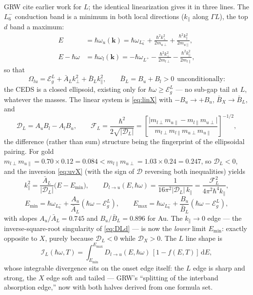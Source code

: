 \documentclass[11pt,a4paper]{article}
\numberwithin{equation}{section}
\newcommand{\hw}{\hbar\omega}
\newcommand{\EgL}{\mathcal{E}_g^{L}}
\newcommand{\cD}{\mathcal{D}}
\newcommand{\cF}{\mathcal{F}}
\newcommand{\cI}{\mathcal{I}}
\newcommand{\BX}{\bar{B}_X}
\newcommand{\AL}{\bar{A}_L}
\newcommand{\BL}{\bar{B}_L}
\newcommand{\kperp}{k_{\perp}}
\newcommand{\kpar}{k_{\parallel}}
\newcommand{\dd}{\mathrm{d}}
\newcommand{\wLsix}{\hbar\omega_{L_6^-}}
\newcommand{\wLplus}{\hbar\omega_{L^+}}
\begin{document}
GRW cite earlier work for $L$; the identical linearization gives it
in three lines.  The $L_6^-$ conduction band is a minimum in both
local directions ($\kpar$ along $\Gamma L$), the top $d$ band a
maximum:
\begin{align}
E&=\hbar\omega_u(\mathbf k)
=\wLsix+\frac{\hbar^2\kperp^2}{2m_{u\perp}}
       +\frac{\hbar^2\kpar^2}{2m_{u\parallel}},
\label{eq:Lbands1}\\[2pt]
E-\hw&=\hbar\omega_l(\mathbf k)
=-\wLplus-\frac{\hbar^2\kperp^2}{2m_{l\perp}}
         -\frac{\hbar^2\kpar^2}{2m_{l\parallel}} ,
\label{eq:Lbands2}
\end{align}
so that
\begin{equation}
\Omega_{lu}=\EgL+\AL\kperp^2+\BL\kpar^2,
\qquad \BL=B_u+B_l>0\ \ \text{unconditionally:}
\end{equation}
the CEDS is a closed ellipsoid, existing only for $\hw\ge\EgL$
--- no sub-gap tail at $L$, whatever the masses.  The linear system
is \eqref{eq:linX} with $-B_u\to+B_u$, $\BX\to\BL$, and
\begin{equation}
\cD_L=A_uB_l-A_lB_u,
\qquad
\cF_L=\frac{\hbar^2}{2\sqrt{|\cD_L|}}
=\left[\frac{\bigl|m_{l\perp}m_{u\parallel}
             -m_{l\parallel}m_{u\perp}\bigr|}
{m_{l\perp}m_{l\parallel}m_{u\perp}m_{u\parallel}}\right]^{-1/2},
\label{eq:DL}
\end{equation}
the difference (rather than sum) structure being the fingerprint of
the ellipsoidal pairing.  For gold
$m_{l\perp}m_{u\parallel}=0.70\times0.12=0.084
<m_{l\parallel}m_{u\perp}=1.03\times0.24=0.247$, so
$\boxed{\cD_L<0}$, and the inversion \eqref{eq:uvX} (with the sign of
$\cD$ reversing both inequalities) yields
\begin{equation}
\kpar^2=\frac{\AL}{|\cD_L|}\bigl(E-E_{\min}\bigr),
\qquad
D_{l\to u}(E,\hw)
=\frac{1}{16\pi^2|\cD_L|\,\kpar}
=\frac{\cF_L^2}{4\pi^2\hbar^4\kpar},
\label{eq:DLd}
\end{equation}
\begin{equation}
E_{\min}=\wLsix+\frac{A_u}{\AL}(\hw-\EgL),
\qquad
E_{\max}=\wLsix+\frac{B_u}{\BL}(\hw-\EgL),
\label{eq:Lwindow}
\end{equation}
with slopes $A_u/\AL=0.745$ and $B_u/\BL=0.896$ for Au.  The
$\kpar\to0$ edge --- the inverse-square-root singularity of
\eqref{eq:DLd} --- is now the \emph{lower} limit $E_{\min}$: exactly
opposite to $X$, purely because $\cD_L<0$ while $\cD_X>0$.  The
$L$ line shape is
\begin{equation}
\cI_L(\hw,T)=\int_{E_{\min}}^{E_{\max}}
D_{l\to u}(E,\hw)\,[1-f(E,T)]\,\dd E ,
\end{equation}
whose integrable divergence sits on the onset edge itself: the $L$
edge is sharp and strong, the $X$ edge soft and tailed --- GRW's
``splitting of the interband absorption edge,'' now with both halves
derived from one formula set.
\end{document}
